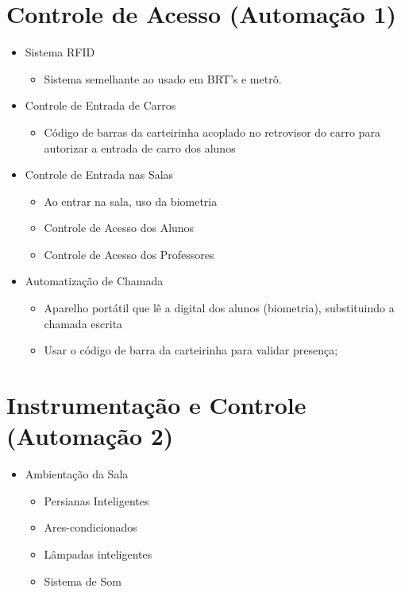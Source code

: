 \begin{apendicesenv}
\section{Controle de Acesso (Automação 1)}
  \begin{itemize}
    \item Sistema RFID
      \begin{itemize}
        \item Sistema semelhante ao usado em BRT’s e metrô.
      \end{itemize}
    \item Controle de Entrada de Carros
      \begin{itemize}
        \item Código de barras da carteirinha acoplado no retrovisor do carro para autorizar a entrada de carro dos alunos
      \end{itemize}
    \item Controle de Entrada nas Salas
      \begin{itemize}
        \item Ao entrar na sala, uso da biometria
        \item Controle de Acesso dos Alunos
        \item Controle de Acesso dos Professores
      \end{itemize}
    \item Automatização de Chamada
      \begin{itemize}
        \item Aparelho portátil que lê a digital dos alunos (biometria), substituindo a chamada escrita
        \item Usar o código de barra da carteirinha para validar presença;
      \end{itemize}
  \end{itemize}
\section{Instrumentação e Controle (Automação 2)}
  \begin{itemize}
    \item Ambientação da Sala
      \begin{itemize}
        \item Persianas Inteligentes
        \item Ares-condicionados
        \item Lâmpadas inteligentes
        \item Sistema de Som
      \end{itemize}


\end{itemize}
\end{apendicesenv}
